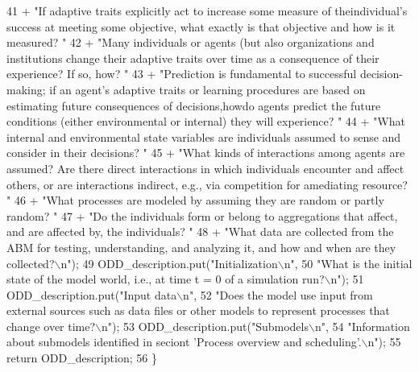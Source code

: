 \begin{DoxyCode}
41                                 + \textcolor{stringliteral}{"If adaptive traits explicitly act to increase some measure of
       theindividual's success at meeting some objective, what exactly is that objective and how is it measured? "}
42                                 + \textcolor{stringliteral}{"Many individuals or agents (but also organizations and institutions
       change their adaptive traits over time as a consequence of their experience? If so, how? "}
43                                 + \textcolor{stringliteral}{"Prediction is fundamental to successful decision-making; if an agent's
       adaptive traits or learning procedures are based on estimating future consequences of decisions,howdo agents
       predict the future conditions (either environmental or internal) they will experience? "}
44                                 + \textcolor{stringliteral}{"What internal and environmental state variables are individuals assumed
       to sense and consider in their decisions? "}
45                                 + \textcolor{stringliteral}{"What kinds of interactions among agents are assumed? Are there direct
       interactions in which individuals encounter and affect others, or are interactions indirect, e.g., via
       competition for amediating resource? "}
46                                 + \textcolor{stringliteral}{"What processes are modeled by assuming they are random or partly random?
       "}
47                                 + \textcolor{stringliteral}{"Do the individuals form or belong to aggregations that affect, and are
       affected by, the individuals? "}
48                                 + \textcolor{stringliteral}{"What data are collected from the ABM for testing, understanding, and
       analyzing it, and how and when are they collected?\(\backslash\)n"});
49         ODD\_description.put(\textcolor{stringliteral}{"Initialization\(\backslash\)n"},
50                         \textcolor{stringliteral}{"What is the initial state of the model world, i.e., at time t = 0 of a simulation
       run?\(\backslash\)n"});
51         ODD\_description.put(\textcolor{stringliteral}{"Input data\(\backslash\)n"},
52                         \textcolor{stringliteral}{"Does the model use input from external sources such as data files or other models
       to represent processes that change over time?\(\backslash\)n"});
53         ODD\_description.put(\textcolor{stringliteral}{"Submodels\(\backslash\)n"},
54                         \textcolor{stringliteral}{"Information about submodels identified in seciont 'Process overview and
       scheduling'.\(\backslash\)n"});
55         \textcolor{keywordflow}{return} ODD\_description;
56     \}
\end{DoxyCode}


